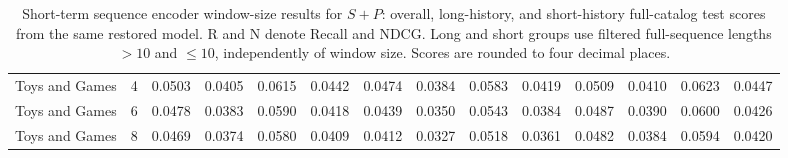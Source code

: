 \documentclass[11pt]{article}
\begin{document}
\begin{table}[!t]
{\begin{tabular}{lccccc|cccc|cccc}
Toys and Games & 4 & 0.0503 & 0.0405 & 0.0615 & 0.0442 & 0.0474 & 0.0384 & 0.0583 & 0.0419 & 0.0509 & 0.0410 & 0.0623 & 0.0447\\
Toys and Games & 6 & 0.0478 & 0.0383 & 0.0590 & 0.0418 & 0.0439 & 0.0350 & 0.0543 & 0.0384 & 0.0487 & 0.0390 & 0.0600 & 0.0426\\
Toys and Games & 8 & 0.0469 & 0.0374 & 0.0580 & 0.0409 & 0.0412 & 0.0327 & 0.0518 & 0.0361 & 0.0482 & 0.0384 & 0.0594 & 0.0420\\
\bottomrule
\end{tabular}%
}
\caption{Short-term sequence encoder window-size results for $S+P$: overall, long-history, and short-history full-catalog test scores from the same restored model. R and N denote Recall and NDCG. Long and short groups use filtered full-sequence lengths $>10$ and $\leq10$, independently of window size. Scores are rounded to four decimal places.}
\label{tab:short_window}
\end{table}
\end{document}
